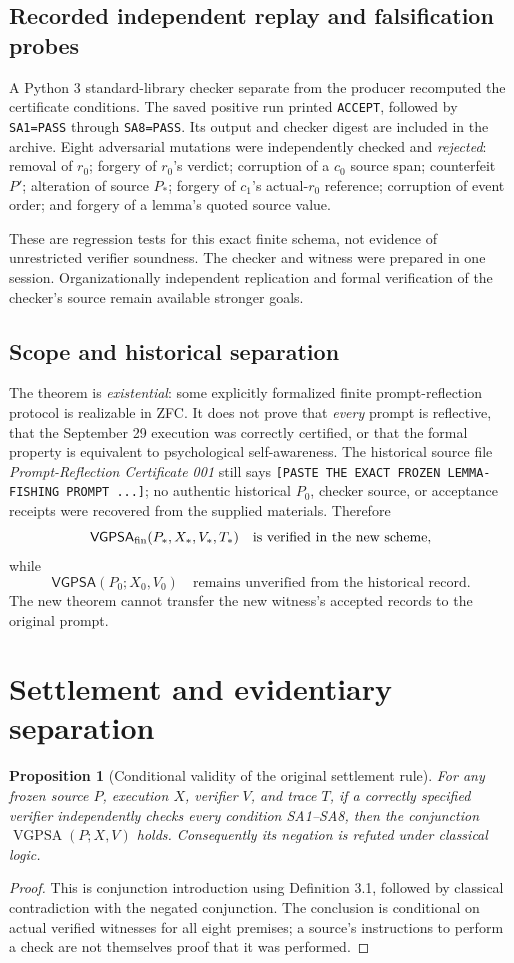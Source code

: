 \documentclass[11pt]{article}
\newtheorem{proposition}[definition]{Proposition}
\theoremstyle{remark}
\newcommand{\VGPSA}{\operatorname{VGPSA}}
\begin{document}
\subsection{Recorded independent replay and falsification probes}
A Python 3 standard-library checker separate from the producer recomputed the certificate conditions. The saved positive run printed \texttt{ACCEPT}, followed by \texttt{SA1=PASS} through \texttt{SA8=PASS}. Its output and checker digest are included in the archive. Eight adversarial mutations were independently checked and \emph{rejected}: removal of $r_0$; forgery of $r_0$'s verdict; corruption of a $c_0$ source span; counterfeit $P'$; alteration of source $P_*$; forgery of $c_1$'s actual-$r_0$ reference; corruption of event order; and forgery of a lemma's quoted source value.

These are regression tests for this exact finite schema, not evidence of unrestricted verifier soundness. The checker and witness were prepared in one session. Organizationally independent replication and formal verification of the checker's source remain available stronger goals.

\subsection{Scope and historical separation}
The theorem is \emph{existential}: some explicitly formalized finite prompt-reflection protocol is realizable in ZFC. It does not prove that \emph{every} prompt is reflective, that the September 29 execution was correctly certified, or that the formal property is equivalent to psychological self-awareness. The historical source file \emph{Prompt-Reflection Certificate 001} still says \texttt{[PASTE THE EXACT FROZEN LEMMA-FISHING PROMPT ...]}; no authentic historical $P_0$, checker source, or acceptance receipts were recovered from the supplied materials. Therefore
\[
\mathsf{VGPSA}_{\rm fin}(P_*,X_*,V_*,T_*)\quad\text{is verified in the new scheme,}
\]
while
\[
\mathsf{VGPSA}(P_0;X_0,V_0)\quad\text{remains unverified from the historical record.}
\]
The new theorem cannot transfer the new witness's accepted records to the original prompt.


\section{Settlement and evidentiary separation}
\begin{proposition}[Conditional validity of the original settlement rule]
For any frozen source $P$, execution $X$, verifier $V$, and trace $T$, if a correctly specified verifier independently checks every condition SA1--SA8, then the conjunction $\VGPSA(P;X,V)$ holds. Consequently its negation is refuted under classical logic.
\end{proposition}
\begin{proof}
This is conjunction introduction using Definition 3.1, followed by classical contradiction with the negated conjunction. The conclusion is conditional on actual verified witnesses for all eight premises; a source's instructions to perform a check are not themselves proof that it was performed.
\end{proof}
\end{document}
